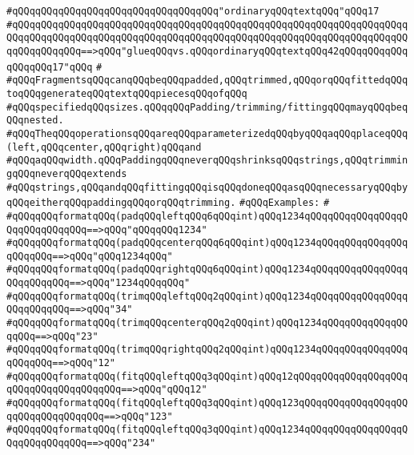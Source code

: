 \verb|#qQQqqQQqqQQqqQQqqQQqqQQqqQQqqQQqqQQq"ordinaryqQQqtextqQQq"qQQq17|\newline
\verb|#qQQqqQQqqQQqqQQqqQQqqQQqqQQqqQQqqQQqqQQqqQQqqQQqqQQqqQQqqQQqqQQqqQQqqQQqqQQqqQQqqQQqqQQqqQQqqQQqqQQqqQQqqQQqqQQqqQQqqQQqqQQqqQQqqQQqqQQqqQQqqQQqqQQqqQQq==>qQQq"glueqQQqvs.qQQqordinaryqQQqtextqQQq42qQQqqQQqqQQqqQQqqQQq17"qQQq|\newline
\verb|#|\newline
\verb|#qQQqFragmentsqQQqcanqQQqbeqQQqpadded,qQQqtrimmed,qQQqorqQQqfittedqQQqtoqQQqgenerateqQQqtextqQQqpiecesqQQqofqQQq|\newline
\verb|#qQQqspecifiedqQQqsizes.qQQqqQQqPadding/trimming/fittingqQQqmayqQQqbeqQQqnested.|\newline
\verb|#qQQqTheqQQqoperationsqQQqareqQQqparameterizedqQQqbyqQQqaqQQqplaceqQQq(left,qQQqcenter,qQQqright)qQQqand|\newline
\verb|#qQQqaqQQqwidth.qQQqPaddingqQQqneverqQQqshrinksqQQqstrings,qQQqtrimmingqQQqneverqQQqextends|\newline
\verb|#qQQqstrings,qQQqandqQQqfittingqQQqisqQQqdoneqQQqasqQQqnecessaryqQQqbyqQQqeitherqQQqpaddingqQQqorqQQqtrimming.|\newline
\verb|#qQQqExamples:|\newline
\verb|#|\newline
\verb|#qQQqqQQqformatqQQq(padqQQqleftqQQq6qQQqint)qQQq1234qQQqqQQqqQQqqQQqqQQqqQQqqQQqqQQq==>qQQq"qQQqqQQq1234"|\newline
\verb|#qQQqqQQqformatqQQq(padqQQqcenterqQQq6qQQqint)qQQq1234qQQqqQQqqQQqqQQqqQQqqQQq==>qQQq"qQQq1234qQQq"|\newline
\verb|#qQQqqQQqformatqQQq(padqQQqrightqQQq6qQQqint)qQQq1234qQQqqQQqqQQqqQQqqQQqqQQqqQQq==>qQQq"1234qQQqqQQq"|\newline
\verb|#qQQqqQQqformatqQQq(trimqQQqleftqQQq2qQQqint)qQQq1234qQQqqQQqqQQqqQQqqQQqqQQqqQQq==>qQQq"34"|\newline
\verb|#qQQqqQQqformatqQQq(trimqQQqcenterqQQq2qQQqint)qQQq1234qQQqqQQqqQQqqQQqqQQq==>qQQq"23"|\newline
\verb|#qQQqqQQqformatqQQq(trimqQQqrightqQQq2qQQqint)qQQq1234qQQqqQQqqQQqqQQqqQQqqQQq==>qQQq"12"|\newline
\verb|#qQQqqQQqformatqQQq(fitqQQqleftqQQq3qQQqint)qQQq12qQQqqQQqqQQqqQQqqQQqqQQqqQQqqQQqqQQqqQQq==>qQQq"qQQq12"|\newline
\verb|#qQQqqQQqformatqQQq(fitqQQqleftqQQq3qQQqint)qQQq123qQQqqQQqqQQqqQQqqQQqqQQqqQQqqQQqqQQq==>qQQq"123"|\newline
\verb|#qQQqqQQqformatqQQq(fitqQQqleftqQQq3qQQqint)qQQq1234qQQqqQQqqQQqqQQqqQQqqQQqqQQqqQQq==>qQQq"234"|\newline

